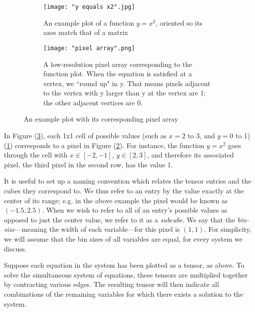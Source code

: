 \documentclass[11pt]{article}
\begin{document}
\begin{figure}[h]
\begin{subfigure}{.4\textwidth}
  \centering
  \captionsetup{width=0.8\textwidth}
  \texttt{[image: "y equals x2".jpg]}
  \caption{An example plot of a function $y = x^2$, oriented so its axes match that of a matrix\\\vspace{.6in}}
  \label{sample_function}
\end{subfigure}%
\begin{subfigure}{.4\textwidth}
  \centering
  \captionsetup{width=0.84\textwidth}
  \texttt{[image: "pixel array".png]}
  \caption{A low-resolution pixel array corresponding to the function plot. When the equation is satisfied at a vertex, we ``round up" in y. That means pixels adjacent to the vertex with y larger than y at the vertex are 1; the other adjacent vertices are 0.}
  \label{sample_pixel_array}
\end{subfigure}%
\caption{An example plot with its corresponding pixel array}
\label{plot_and_pa}
\end{figure}

In Figure (\ref{plot_and_pa}), each 1x1 cell of possible values (such as $x = 2$ to 3, and $y = 0$ to 1) (\ref{sample_function}) corresponds to a pixel in Figure (\ref{sample_pixel_array}). For instance, the function $y=x^2$ goes through the cell with $x \in [-2,-1]$, $y \in [2,3]$, and therefore its associated pixel, the third pixel in the second row, has the value 1.

It is useful to set up a naming convention which relates the tensor entries and the cubes they correspond to. We thus refer to an entry by the value exactly at the center of its range; e.g. in the above example the pixel would be known as $(-1.5, 2.5)$. When we wish to refer to all of an entry's possible values as opposed to just the center value, we refer to it as a \textit{subcube}. We say that the \textit{bin-size}---meaning the width of each variable---for this pixel is $(1,1)$. For simplicity, we will assume that the bin sizes of all variables are equal, for every system we discuss.

Suppose each equation in the system has been plotted as a tensor, as above. To solve the simultaneous system of equations, these tensors are multiplied together by contracting various edges. The resulting tensor will then indicate all combinations of the remaining variables for which there exists a solution to the system.
\end{document}
